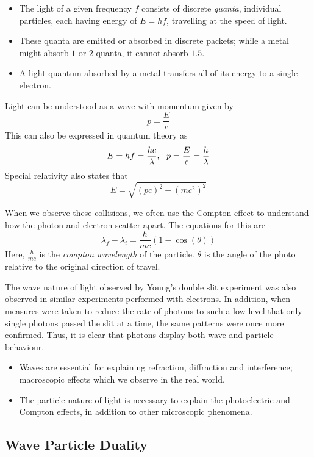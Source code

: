 \documentclass[12pt]{report}
\begin{document}
\begin{flushleft}
\begin{itemize}
    \item The light of a given frequency \(f\) consists of discrete
        \textit{quanta}, individual particles, each having energy of
        \(E = hf\), travelling at the speed of light.
    \item These quanta are emitted or absorbed in discrete packets; while
        a metal might absorb \(1\) or \(2\) quanta, it cannot absorb \(1.5\).
    \item A light quantum absorbed by a metal transfers all of its energy to a
        single electron.
\end{itemize}

Light can be understood as a wave with momentum given by
\[p = \frac{E}{c}\]
This can also be expressed in quantum theory as
\[E = hf = \frac{hc}{\lambda} , \:\:\: p = \frac{E}{c} = \frac{h}{\lambda}\]
Special relativity also states that
\[E = \sqrt{(pc)^2 + (mc^2)^2}\]

\bigskip
When we observe these collisions, we often use the Compton effect to understand
how the photon and electron scatter apart. The equations for this are
\[\lambda_f - \lambda_i = \frac{h}{mc}(1 - \cos(\theta))\]
Here, \(\frac{h}{mc}\) is the \textit{compton wavelength} of the particle.
\(\theta\) is the angle of the photo relative to the original direction of
travel.

\bigskip
The wave nature of light observed by Young's double slit experiment was also
observed in similar experiments performed with electrons. In addition, when
measures were taken to reduce the rate of photons to such a low level that only
single photons passed the slit at a time, the same patterns were once more
confirmed. Thus, it is clear that photons display both wave and particle
behaviour.

\begin{itemize}
    \item Waves are essential for explaining refraction, diffraction and
        interference; macroscopic effects which we observe in the real world.
    \item The particle nature of light is necessary to explain the
        photoelectric and Compton effects, in addition to other microscopic 
        phenomena.
\end{itemize}

\subsection*{Wave Particle Duality}


\end{flushleft}
\end{document}
